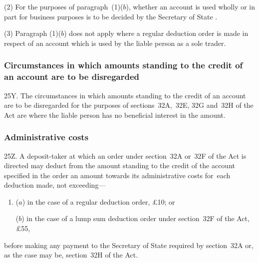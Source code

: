 \documentclass[12pt,a4paper]{article}
\begin{document}
(2) For the purposes of paragraph~(1)($b$), whether an account is used wholly or in part for business purposes is to be decided by the 
Secretary of State%
.

(3) Paragraph (1)($b$)  does not apply where a regular deduction order is made in respect of an account which is used by the liable person as a sole trader.


\subsubsection[25Y. Circumstances in which amounts standing to the credit of an account are to be disregarded]{Circumstances in which amounts standing to the credit of an account are to be disregarded}

25Y.  The circumstances in which amounts standing to the credit of an account are to be disregarded for the purposes of sections~32A,~32E, 32G and~32H of the Act are where the liable person has no beneficial interest in the amount.

\subsubsection[25Z. Administrative costs]{Administrative costs}

25Z.  A deposit-taker at which an order under section~32A or~32F of the Act is directed may deduct from the amount standing to the credit of the account specified in the order an amount towards its administrative costs for~each deduction made, not exceeding—
\begin{enumerate}\item[]
($a$) in the case of a regular deduction order, £10; or

($b$) in the case of a lump sum deduction order under section~32F of the Act, £55,
\end{enumerate}
before making any payment to the 
Secretary of State  %
required by section~32A or, as the case may be, section~32H of the Act.

\end{document}
